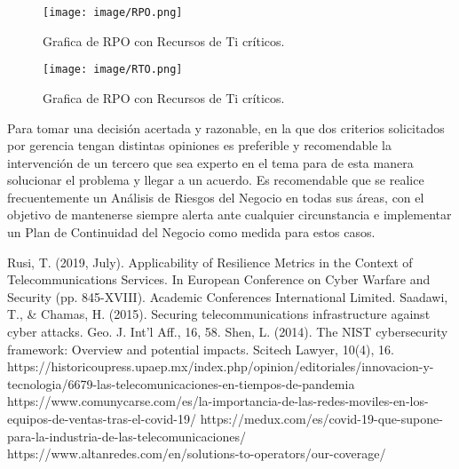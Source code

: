 \documentclass[conference]{IEEEtran}
\begin{document}
\begin{figure}[h!]
\centerline{\texttt{[image: image/RPO.png]}}
\caption{Grafica de RPO con Recursos de Ti críticos.}
\label{fig}
\end{figure}

\begin{figure}[h!]
\centerline{\texttt{[image: image/RTO.png]}}
\caption{Grafica de RPO con Recursos de Ti críticos.}
\label{fig}
\end{figure}
\newpage

Para  tomar  una  decisión  acertada  y  razonable,  
en  la  que  dos  criterios  solicitados  por  gerencia  
tengan distintas opiniones es preferible y 
recomendable  la  intervención  de  un  tercero  que  
sea experto en el tema para de esta manera 
solucionar el problema y llegar a un acuerdo. 
Es recomendable que se realice frecuentemente 
un  Análisis  de  Riesgos  del  Negocio  en  todas  sus  
áreas, con el objetivo de mantenerse siempre alerta 
ante cualquier circunstancia e implementar un 
Plan  de  Continuidad  del  Negocio  como  medida  
para estos casos.  

\newpage
\begin{thebibliography}{00}
Rusi, T. (2019, July). Applicability of Resilience Metrics in the Context of Telecommunications Services. In European Conference on Cyber Warfare and Security (pp. 845-XVIII). Academic Conferences International Limited.
 Saadawi, T., \& Chamas, H. (2015). Securing telecommunications infrastructure against cyber attacks. Geo. J. Int'l Aff., 16, 58.
 Shen, L. (2014). The NIST cybersecurity framework: Overview and potential impacts. Scitech Lawyer, 10(4), 16.
https://historicoupress.upaep.mx/index.php/opinion/editoriales/innovacion-y-tecnologia/6679-las-telecomunicaciones-en-tiempos-de-pandemia
https://www.comunycarse.com/es/la-importancia-de-las-redes-moviles-en-los-equipos-de-ventas-tras-el-covid-19/
https://medux.com/es/covid-19-que-supone-para-la-industria-de-las-telecomunicaciones/
https://www.altanredes.com/en/solutions-to-operators/our-coverage/
\end{thebibliography} 
\end{document}
